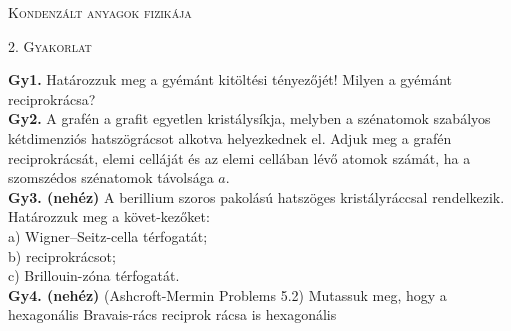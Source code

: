 \documentclass[12pt]{article}
\begin{document}
\centerline{
\textsc{\Large{ Kondenzált anyagok fizikája}}
}
\centerline{ 
\textsc{\large{2. Gyakorlat}}
}
\vspace{10mm}

\textbf{Gy1.} Határozzuk meg a gyémánt kitöltési tényezőjét! Milyen a gyémánt reciprokrácsa?
\\

\textbf{Gy2.} A grafén a grafit egyetlen kristálysíkja, melyben a szénatomok szabályos kétdimenziós hatszögrácsot alkotva helyezkednek el. Adjuk meg a grafén reciprokrácsát, elemi celláját és az elemi cellában lévő atomok számát, ha a szomszédos szénatomok távolsága $a$.
\\

\textbf{Gy3. (nehéz)} A berillium szoros pakolású hatszöges kristályráccsal rendelkezik. Határozzuk meg a követ-kezőket:
\\
a) Wigner–Seitz-cella térfogatát;
\\
b) reciprokrácsot;
\\
c) Brillouin-zóna térfogatát.
\\

\textbf{Gy4. (nehéz)} (Ashcroft-Mermin Problems 5.2) Mutassuk meg, hogy a hexagonális Bravais-rács reciprok rácsa is hexagonális
\end{document}
